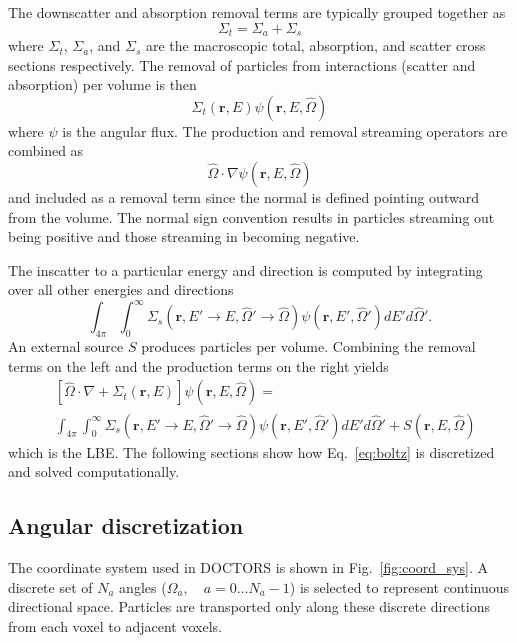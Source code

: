 The downscatter and absorption removal terms are typically grouped together as
\begin{equation}
\Sigma_t = \Sigma_a + \Sigma_s
\end{equation}
where $\Sigma_t$, $\Sigma_a$, and $\Sigma_s$ are the macroscopic total, absorption, and scatter cross sections respectively. The removal of particles from interactions (scatter and absorption) per volume is then
\begin{equation}
\Sigma_t(\boldsymbol{r}, E) \psi(\boldsymbol{r}, E, \hat{\Omega})
\end{equation}
where $\psi$ is the angular flux. The production and removal streaming operators are combined as 
\begin{equation}
\hat{\Omega} \cdot \nabla \psi(\boldsymbol{r}, E, \hat{\Omega})
\end{equation}
and included as a removal term since the normal is defined pointing outward from the volume. The normal sign convention results in particles streaming out being positive and those streaming in becoming negative. 

The inscatter to a particular energy and direction is computed by integrating over all other energies and directions
\begin{equation}
\int_{4\pi}^{} \int_{0}^{\infty} \Sigma_s(\boldsymbol{r}, E' \rightarrow E, \hat{\Omega}' \rightarrow \hat{\Omega}) \psi(\boldsymbol{r}, E', \hat{\Omega}') dE' d\hat{\Omega}'.
\end{equation}
An external source $S$ produces particles per volume. Combining the removal terms on the left and the production terms on the right yields
\begin{equation} \label{eq:boltz}
\begin{split}
	&\left[ \hat{\Omega} \cdot \nabla + \Sigma_t(\boldsymbol{r}, E) \right]
	\psi(\boldsymbol{r}, E, \hat{\Omega}) = \\
	&\int_{4 \pi} \int_0^\infty \Sigma_s(\boldsymbol{r}, E' \rightarrow E, \hat{\Omega}' \rightarrow \hat{\Omega}) \psi(\boldsymbol{r}, E', \hat{\Omega}') dE' d\hat{\Omega}' + S(\boldsymbol{r}, E, \hat{\Omega})
\end{split}
\end{equation}
which is the LBE. The following sections show how Eq.~\ref{eq:boltz} is discretized and solved computationally.

\subsection{Angular discretization}
The coordinate system used in DOCTORS is shown in Fig.~\ref{fig:coord_sys}. A discrete set of $N_a$ angles ($\Omega_{a}, \quad a = 0 \ldots N_a-1$) is selected to represent continuous directional space. Particles are transported only along these discrete directions from each voxel to adjacent voxels.

